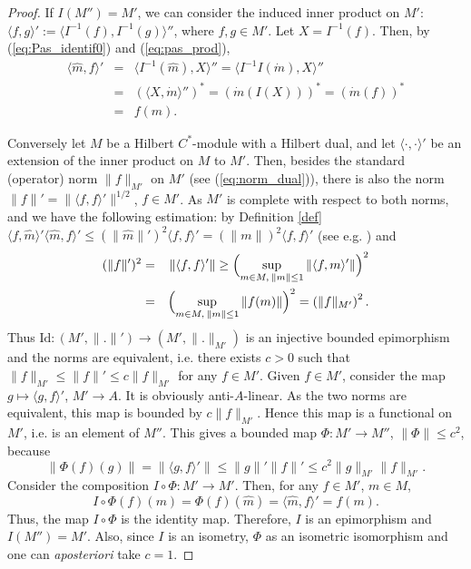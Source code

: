 \documentclass[12pt]{amsart}
\def\<{\langle}
\def\>{\rangle}
\begin{document}
\begin{proof}
If $I(M'')=M'$,  we can consider the induced inner product on  $M'$: $\<f,g\>':=\<I^{-1}(f),I^{-1}(g)\>''$, where $f,g\in M'$.
Let $X=I^{-1}(f)$. Then, by (\ref{eq:Pas_identif0}) and (\ref{eq:pas_prod}),
\begin{eqnarray*}
\<\widehat{m},f \>'&=&\<I^{-1}(\widehat{m}),X\>''=\<I^{-1} I(\dot{m}),X\>''\\\
&=&(\<X, \dot{m}\>'')^*=(\dot m(I(X)))^*=(\dot m(f))^*\\
&=&f(m).
\end{eqnarray*}

Conversely let $M$ be a Hilbert $C^*$-module with a Hilbert dual, and let $\langle\cdot,\cdot\rangle'$ be an extension of the inner product on $M$ to $M'$. Then, besides the standard (operator)  norm $\|f\|_{M'}$ on $M'$ (see (\ref{eq:norm_dual})),  there is also the norm $\|f\|'=\|\langle f,f\rangle'\|^{1/2}$, $f\in M'$. As $M'$ is complete with respect to both norms, and we have the following estimation:
by  Definition \ref{def} $\<f,\widehat{m}\>' \<\widehat{m},f\>' \le (\|\widehat{m}\|')^2 \<f,f\>'= (\|m\|)^2 \<f,f\>'$ (see e.g. \cite[Prop. 1.2.4]{MTBook}) and
\begin{eqnarray*}
(\|f\|')^2&=&\|\<f,f\>'\| \ge \Bigl(\sup_{m\in M,\: \|m\|\le 1} \|\<f,m\>'\|\Bigr)^2\\
&=& \Bigl(\sup_{m\in M,\: \|m\|\le 1} \|f(m)\|\Bigr)^2=\left(\|f\|_{M'}\right)^2.
\end{eqnarray*}
Thus $\mathrm{Id}: (M',\|.\|') \to (M',\|.\|_{M'})$ is an injective bounded epimorphism and the norms
are equivalent, i.e. there exists $c>0$ such that $\|f\|_{M'}\leq \|f\|'\leq c\|f\|_{M'}$ for any $f\in M'$. Given $f\in M'$, consider the map $g\mapsto \langle g,f\rangle'$, $M'\to A$. It is obviously anti-$A$-linear. As the two norms are equivalent, this map is bounded by $c \|f\|_{M'}$. Hence this map is a functional on $M'$, i.e. is an element of $M''$. This gives a bounded map $\Phi:M'\to M''$, $\|\Phi\|\le c^2$, because
$$ 
\|\Phi(f)(g)\|=\|\<g,f\>'\|\le \|g\|'\|f\|'\le c^2 \|g\|_{M'} \|f\|_{M'}. 
$$
Consider the composition $I\circ\Phi:M'\to M'$. Then, for any $f\in M'$, $m\in M$, 
$$
 I\circ\Phi(f)(m)=\Phi(f)(\widehat m)=\<\widehat{m},f\>'=f(m). 
$$
Thus, the map $I\circ\Phi$ is the identity map. Therefore, $I$ is an epimorphism and $I(M'')=M'$.
Also, since $I$ is an isometry, $\Phi$ as an isometric isomorphism and one can \emph{aposteriori} take $c=1$.
\end{proof}
\end{document}
